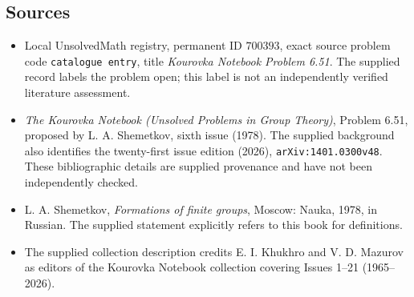 \documentclass[11pt]{article}
\begin{document}
\subsection{Sources}
\begin{itemize}
\item Local UnsolvedMath registry, permanent ID \(700393\), exact source problem code \texttt{catalogue entry}, title \emph{Kourovka Notebook Problem 6.51}. The supplied record labels the problem open; this label is not an independently verified literature assessment.
\item \emph{The Kourovka Notebook (Unsolved Problems in Group Theory)}, Problem 6.51, proposed by L. A. Shemetkov, sixth issue (1978). The supplied background also identifies the twenty-first issue edition (2026), \texttt{arXiv:1401.0300v48}. These bibliographic details are supplied provenance and have not been independently checked.
\item L. A. Shemetkov, \emph{Formations of finite groups}, Moscow: Nauka, 1978, in Russian. The supplied statement explicitly refers to this book for definitions.
\item The supplied collection description credits E. I. Khukhro and V. D. Mazurov as editors of the Kourovka Notebook collection covering Issues 1--21 (1965--2026).
\end{itemize}
\end{document}
